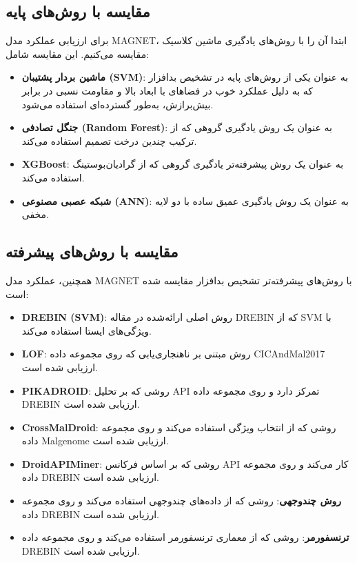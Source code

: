\subsection{مقایسه با روش‌های پایه}
برای ارزیابی عملکرد مدل MAGNET، ابتدا آن را با روش‌های یادگیری ماشین کلاسیک مقایسه می‌کنیم. این مقایسه شامل:
\begin{itemize}
    \item \textbf{ماشین بردار پشتیبان (SVM)}: به عنوان یکی از روش‌های پایه در تشخیص بدافزار که به دلیل عملکرد خوب در فضاهای با ابعاد بالا و مقاومت نسبی در برابر بیش‌برازش، به‌طور گسترده‌ای استفاده می‌شود.
    \item \textbf{جنگل تصادفی (Random Forest)}: به عنوان یک روش یادگیری گروهی که از ترکیب چندین درخت تصمیم استفاده می‌کند.
    \item \textbf{XGBoost}: به عنوان یک روش پیشرفته‌تر یادگیری گروهی که از گرادیان‌بوستینگ استفاده می‌کند.
    \item \textbf{شبکه عصبی مصنوعی (ANN)}: به عنوان یک روش یادگیری عمیق ساده با دو لایه مخفی.
\end{itemize}

\subsection{مقایسه با روش‌های پیشرفته}
همچنین، عملکرد مدل MAGNET با روش‌های پیشرفته‌تر تشخیص بدافزار مقایسه شده است:
\begin{itemize}
    \item \textbf{DREBIN (SVM)}: روش اصلی ارائه‌شده در مقاله DREBIN که از SVM با ویژگی‌های ایستا استفاده می‌کند.
    \item \textbf{LOF}: روش مبتنی بر ناهنجاری‌یابی که روی مجموعه داده CICAndMal2017 ارزیابی شده است.
    \item \textbf{PIKADROID}: روشی که بر تحلیل API تمرکز دارد و روی مجموعه داده DREBIN ارزیابی شده است.
    \item \textbf{CrossMalDroid}: روشی که از انتخاب ویژگی استفاده می‌کند و روی مجموعه داده Malgenome ارزیابی شده است.
    \item \textbf{DroidAPIMiner}: روشی که بر اساس فرکانس API کار می‌کند و روی مجموعه داده DREBIN ارزیابی شده است.
    \item \textbf{روش چندوجهی}: روشی که از داده‌های چندوجهی استفاده می‌کند و روی مجموعه داده DREBIN ارزیابی شده است.
    \item \textbf{ترنسفورمر}: روشی که از معماری ترنسفورمر استفاده می‌کند و روی مجموعه داده DREBIN ارزیابی شده است.
\end{itemize}

